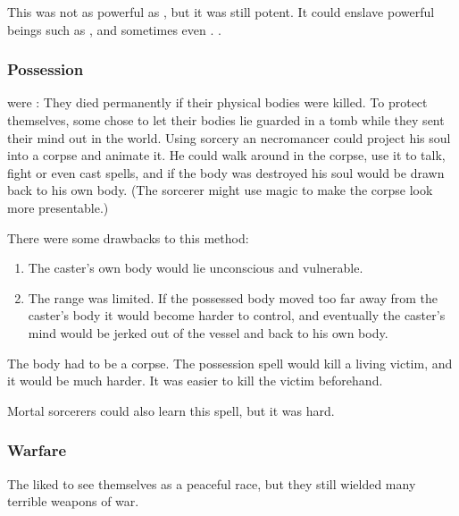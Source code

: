 This was not as powerful as , but it was still potent. 
It could enslave powerful beings such as \aryothim, and sometimes even \resphain.
\Ophidians {}. 






\subsubsection{Possession}
\Ophidians were : 
They died permanently if their physical bodies were killed. 
To protect themselves, some \ophidians chose to let their bodies lie guarded in a tomb while they sent their mind out in the world.
Using sorcery an \ophidian necromancer could project his soul into a corpse and animate it. 
He could walk around in the corpse, use it to talk, fight or even cast spells, and if the body was destroyed his soul would be drawn back to his own body.
(The sorcerer might use magic to make the corpse look more presentable.)

There were some drawbacks to this method:
\begin{enumerate}
  \item 
    The caster's own body would lie unconscious and vulnerable.
  \item 
    The range was limited.
    If the possessed body moved too far away from the caster's body it would become harder to control, and eventually the caster's mind would be jerked out of the vessel and back to his own body.
\end{enumerate}


The body had to be a corpse. 
The possession spell would kill a living victim, and it would be much harder. 
It was easier to kill the victim beforehand. 

Mortal sorcerers could also learn this spell, but it was hard.





\subsubsection{Warfare}
The \ophidians liked to see themselves as a peaceful race, but they still wielded many terrible weapons of war.

